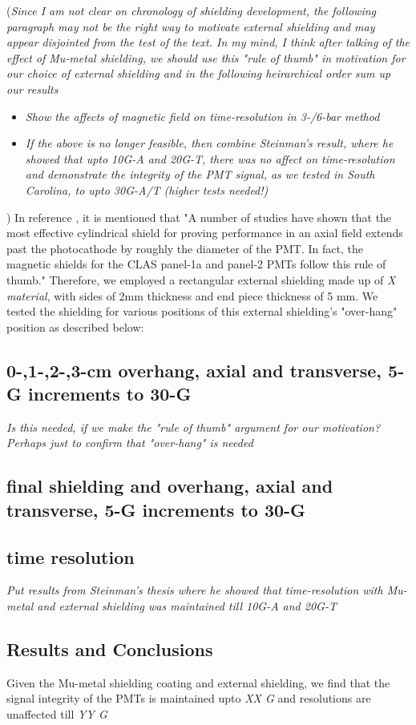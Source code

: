 \documentclass[12pt]{article}
\begin{document}
(\textit{Since I am not clear on chronology of shielding development, the following paragraph may not be the right way to motivate external shielding and may appear disjointed from the test of the text. In my mind, I think after talking of the effect of Mu-metal shielding, we should use this "rule of thumb" \cite{CLAS12FTOFstudies} in motivation for our choice of external shielding and in the following heirarchical order sum up our results}
\begin{itemize}
	\item \textit{Show the affects of magnetic field on time-resolution in 3-/6-bar method}
	\item \textit{If the above is no longer feasible, then combine Steinman's result, where he showed that upto 10G-A and 20G-T, there was no affect on time-resolution and demonstrate the integrity of the PMT signal, as we tested in South Carolina, to upto 30G-A/T (higher tests needed!)}
\end{itemize})
In reference \cite{CLAS12FTOFstudies}, it is mentioned that "A number of studies have shown that the most effective cylindrical shield for proving performance in an axial field extends past the photocathode by roughly
the diameter of the PMT. In fact, the magnetic shields for the CLAS panel-1a and panel-2 PMTs follow this rule of thumb." Therefore, we employed a rectangular external shielding made up of \textit{X material}, with sides of 2mm thickness and end piece thickness of 5 mm. We tested the shielding for various positions of this external shielding's "over-hang" position as described below:


\subsection{0-,1-,2-,3-cm overhang, axial and transverse, 5-G increments to 30-G}
\textit{Is this needed, if we make the "rule of thumb" argument for our motivation? Perhaps just to confirm that "over-hang" is needed}
\subsection{final shielding and overhang, axial and transverse, 5-G increments to 30-G}
\subsection{time resolution}
\textit{Put results from Steinman's thesis where he showed that time-resolution with Mu-metal and external shielding was maintained till 10G-A and 20G-T}
\subsection{Results and Conclusions}

Given the Mu-metal shielding coating and external shielding, we find that the signal integrity of the PMTs is maintained upto \textit{XX G} and resolutions are unaffected till \textit{YY G}


\label{bib}


\end{document}
